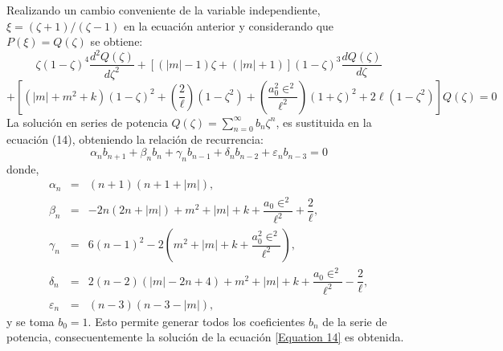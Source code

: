 \documentclass[12pt]{article}
\begin{document}
        Realizando un cambio conveniente de la 
        variable independiente, $\xi = (\zeta + 1)/(\zeta - 1)$ \textcolor{blue}{\cite{Jaffe}}
        en la ecuación anterior y considerando que 
        $P(\xi) = Q(\zeta)$ se obtiene:
        \begin{equation*}
            \zeta(1-\zeta)^{4}\dfrac{d^{2}Q(\zeta)}{d\zeta^{2}} + \left[\left(|m| - 1\right)\zeta + \left(|m| + 1\right)\right](1-\zeta)^{3}\dfrac{dQ(\zeta)}{d\zeta} 
        \end{equation*}
        \begin{equation}\label{Equation 14}
            + \left[ (|m|+m^{2} + k)(1-\zeta)^{2}+\left(\frac{2}{\ell}\right)(1-\zeta^{2}) + \left(\dfrac{a_{0}^{2}\in^{2}}{\ell^{2}}\right)(1+\zeta)^{2} + 2\ell (1-\zeta^{2}) \right]  Q(\zeta) = 0
        \end{equation}
        La solución en series de potencia
        $Q(\zeta) = \sum\limits_{n=0}^{\infty}b_{n}\zeta^{n} $, es sustituida en la ecuación (14), 
        obteniendo la relación de recurrencia:
        \begin{equation}\label{Equation 15}
            \alpha_{n}b_{n+1} + \beta_{n}b_{n} + \gamma_{n}b_{n-1} + \delta_{n}b_{n-2} +\varepsilon_{n}b_{n-3} = 0
        \end{equation}
        donde,
        \begin{eqnarray}
            \alpha_{n} &=& \left(n+1\right)\left(n+1+|m|\right), \label{Equation16}\\
            \beta_{n} &=& -2n\left(2n+|m|\right) + m^{2}+|m| + k + \dfrac{a_{0}\in^{2}}{\ell^{2}}+\dfrac{2}{\ell}, \label{Equation 17}\\
            \gamma_{n} &=& 6(n-1)^{2}-2\left(m^{2} + |m| + k + \dfrac{a_{0}^{2}\in^{2}}{\ell^{2}}\right), \label{Equation 18} \\
            \delta_{n} &=& 2(n-2)\left(|m| - 2n + 4\right) + m^{2} + |m| + k + \dfrac{a_{0}\in^{2}}{\ell^{2}}-\dfrac{2}{\ell}, \label{Equation 19}\\
            \varepsilon_{n} &=& (n-3)\left(n-3-|m|\right), \label{Equation 20}
        \end{eqnarray}
        y se toma $b_{0} = 1$. Esto permite generar todos 
        los coeficientes $b_{n}$
        de la serie de potencia, 
        consecuentemente la solución de la ecuación 
        \eqref{Equation 14} es obtenida.
\end{document}
